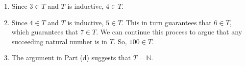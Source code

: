 \begin{enumerate}
\begin{enumerate}
\item Since $3 \in T$ and $T$ is inductive,   $4 \in T$.

\item Since $4 \in T$ and $T$ is inductive, $5 \in T$.  This in turn guarantees that  $6 \in T$, which guarantees that  $7 \in T$.  We can continue this process to argue that any succeeding natural number is in  $T$.  So, $100 \in T$.

\item The argument in Part (d) suggests that  $T = \mathbb{N}$.

\end{enumerate}
\end{enumerate}
\hbreak



\newpage

\endinput
